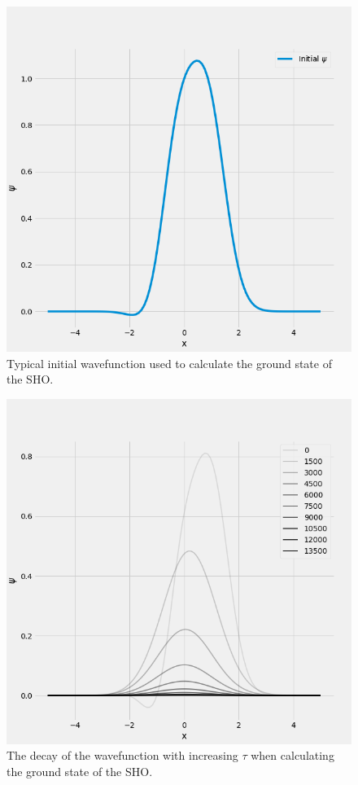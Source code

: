 \documentclass[]{article}
\begin{document}
\begin{figure}
	\centering
	\includegraphics[width=.8\textwidth]{figures/ground_state_init.png}
	\caption{Typical initial wavefunction used to calculate the ground state of the SHO.}
	\label{fig:sho_gs_init}
\end{figure}
\begin{figure}
	\centering
	\includegraphics[width=.8\textwidth]{figures/ground_state_decay.png}
	\caption{The decay of the wavefunction with increasing $\tau$ when calculating the ground state of the SHO.}
	\label{fig:sho_gs_decay}
\end{figure}
\end{document}
